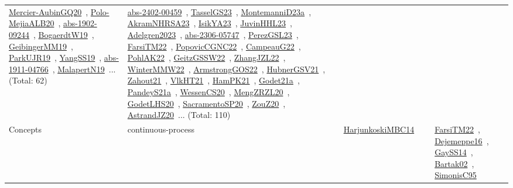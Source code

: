 {\begin{longtable}{lp{3cm}>{\raggedright\arraybackslash}p{6cm}>{\raggedright\arraybackslash}p{6cm}>{\raggedright\arraybackslash}p{8cm}}
\href{../works/Mercier-AubinGQ20.pdf}{Mercier-AubinGQ20}~\cite{Mercier-AubinGQ20}, \href{../works/Polo-MejiaALB20.pdf}{Polo-MejiaALB20}~\cite{Polo-MejiaALB20}, \href{../works/abs-1902-09244.pdf}{abs-1902-09244}~\cite{abs-1902-09244}, \href{../works/BogaerdtW19.pdf}{BogaerdtW19}~\cite{BogaerdtW19}, \href{../works/GeibingerMM19.pdf}{GeibingerMM19}~\cite{GeibingerMM19}, \href{../works/ParkUJR19.pdf}{ParkUJR19}~\cite{ParkUJR19}, \href{../works/YangSS19.pdf}{YangSS19}~\cite{YangSS19}, \href{../works/abs-1911-04766.pdf}{abs-1911-04766}~\cite{abs-1911-04766}, \href{../works/MalapertN19.pdf}{MalapertN19}~\cite{MalapertN19}... (Total: 62) & \href{../works/abs-2402-00459.pdf}{abs-2402-00459}~\cite{abs-2402-00459}, \href{../works/TasselGS23.pdf}{TasselGS23}~\cite{TasselGS23}, \href{../works/MontemanniD23a.pdf}{MontemanniD23a}~\cite{MontemanniD23a}, \href{../works/AkramNHRSA23.pdf}{AkramNHRSA23}~\cite{AkramNHRSA23}, \href{../works/IsikYA23.pdf}{IsikYA23}~\cite{IsikYA23}, \href{../works/JuvinHHL23.pdf}{JuvinHHL23}~\cite{JuvinHHL23}, \href{../works/Adelgren2023.pdf}{Adelgren2023}~\cite{Adelgren2023}, \href{../works/abs-2306-05747.pdf}{abs-2306-05747}~\cite{abs-2306-05747}, \href{../works/PerezGSL23.pdf}{PerezGSL23}~\cite{PerezGSL23}, \href{../works/FarsiTM22.pdf}{FarsiTM22}~\cite{FarsiTM22}, \href{../works/PopovicCGNC22.pdf}{PopovicCGNC22}~\cite{PopovicCGNC22}, \href{../works/CampeauG22.pdf}{CampeauG22}~\cite{CampeauG22}, \href{../works/PohlAK22.pdf}{PohlAK22}~\cite{PohlAK22}, \href{../works/GeitzGSSW22.pdf}{GeitzGSSW22}~\cite{GeitzGSSW22}, \href{../works/ZhangJZL22.pdf}{ZhangJZL22}~\cite{ZhangJZL22}, \href{../works/WinterMMW22.pdf}{WinterMMW22}~\cite{WinterMMW22}, \href{../works/ArmstrongGOS22.pdf}{ArmstrongGOS22}~\cite{ArmstrongGOS22}, \href{../works/HubnerGSV21.pdf}{HubnerGSV21}~\cite{HubnerGSV21}, \href{../works/Zahout21.pdf}{Zahout21}~\cite{Zahout21}, \href{../works/VlkHT21.pdf}{VlkHT21}~\cite{VlkHT21}, \href{../works/HamPK21.pdf}{HamPK21}~\cite{HamPK21}, \href{../works/Godet21a.pdf}{Godet21a}~\cite{Godet21a}, \href{../works/PandeyS21a.pdf}{PandeyS21a}~\cite{PandeyS21a}, \href{../works/WessenCS20.pdf}{WessenCS20}~\cite{WessenCS20}, \href{../works/MengZRZL20.pdf}{MengZRZL20}~\cite{MengZRZL20}, \href{../works/GodetLHS20.pdf}{GodetLHS20}~\cite{GodetLHS20}, \href{../works/SacramentoSP20.pdf}{SacramentoSP20}~\cite{SacramentoSP20}, \href{../works/ZouZ20.pdf}{ZouZ20}~\cite{ZouZ20}, \href{../works/AstrandJZ20.pdf}{AstrandJZ20}~\cite{AstrandJZ20}... (Total: 110)\\
Concepts & continuous-process & \href{../works/HarjunkoskiMBC14.pdf}{HarjunkoskiMBC14}~\cite{HarjunkoskiMBC14} &  & \href{../works/FarsiTM22.pdf}{FarsiTM22}~\cite{FarsiTM22}, \href{../works/Dejemeppe16.pdf}{Dejemeppe16}~\cite{Dejemeppe16}, \href{../works/GaySS14.pdf}{GaySS14}~\cite{GaySS14}, \href{../works/Bartak02.pdf}{Bartak02}~\cite{Bartak02}, \href{../works/SimonisC95.pdf}{SimonisC95}~\cite{SimonisC95}\\

\end{longtable}}
